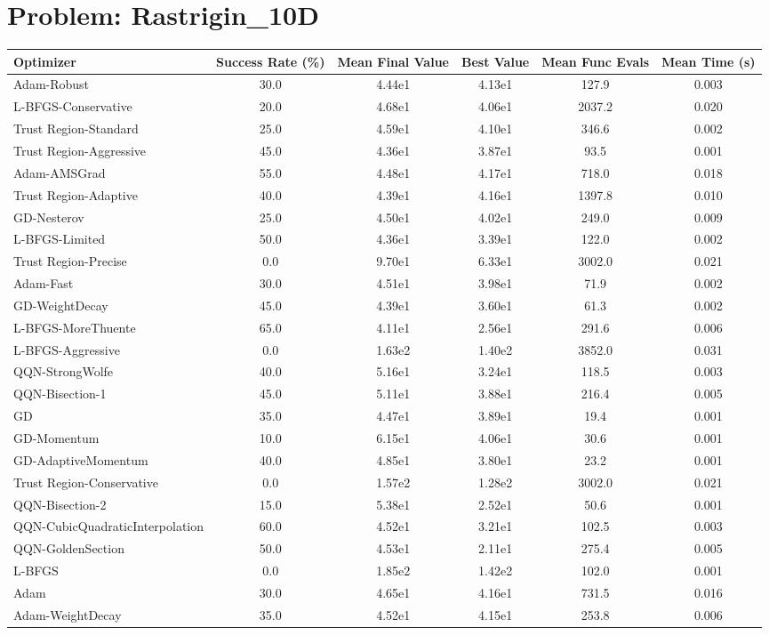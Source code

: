 \documentclass{article}
\begin{document}
\section{Problem: Rastrigin\_10D}
\begin{longtable}{p{3cm}*{5}{c}}
\toprule
\textbf{Optimizer} & \textbf{Success Rate (\%)} & \textbf{Mean Final Value} & \textbf{Best Value} & \textbf{Mean Func Evals} & \textbf{Mean Time (s)} \\
\midrule
Adam-Robust & 30.0 & 4.44e1 & 4.13e1 & 127.9 & 0.003 \\
L-BFGS-Conservative & 20.0 & 4.68e1 & 4.06e1 & 2037.2 & 0.020 \\
Trust Region-Standard & 25.0 & 4.59e1 & 4.10e1 & 346.6 & 0.002 \\
Trust Region-Aggressive & 45.0 & 4.36e1 & 3.87e1 & 93.5 & 0.001 \\
Adam-AMSGrad & 55.0 & 4.48e1 & 4.17e1 & 718.0 & 0.018 \\
Trust Region-Adaptive & 40.0 & 4.39e1 & 4.16e1 & 1397.8 & 0.010 \\
GD-Nesterov & 25.0 & 4.50e1 & 4.02e1 & 249.0 & 0.009 \\
L-BFGS-Limited & 50.0 & 4.36e1 & 3.39e1 & 122.0 & 0.002 \\
Trust Region-Precise & 0.0 & 9.70e1 & 6.33e1 & 3002.0 & 0.021 \\
Adam-Fast & 30.0 & 4.51e1 & 3.98e1 & 71.9 & 0.002 \\
GD-WeightDecay & 45.0 & 4.39e1 & 3.60e1 & 61.3 & 0.002 \\
L-BFGS-MoreThuente & 65.0 & 4.11e1 & 2.56e1 & 291.6 & 0.006 \\
L-BFGS-Aggressive & 0.0 & 1.63e2 & 1.40e2 & 3852.0 & 0.031 \\
QQN-StrongWolfe & 40.0 & 5.16e1 & 3.24e1 & 118.5 & 0.003 \\
QQN-Bisection-1 & 45.0 & 5.11e1 & 3.88e1 & 216.4 & 0.005 \\
GD & 35.0 & 4.47e1 & 3.89e1 & 19.4 & 0.001 \\
GD-Momentum & 10.0 & 6.15e1 & 4.06e1 & 30.6 & 0.001 \\
GD-AdaptiveMomentum & 40.0 & 4.85e1 & 3.80e1 & 23.2 & 0.001 \\
Trust Region-Conservative & 0.0 & 1.57e2 & 1.28e2 & 3002.0 & 0.021 \\
QQN-Bisection-2 & 15.0 & 5.38e1 & 2.52e1 & 50.6 & 0.001 \\
QQN-CubicQuadraticInterpolation & 60.0 & 4.52e1 & 3.21e1 & 102.5 & 0.003 \\
QQN-GoldenSection & 50.0 & 4.53e1 & 2.11e1 & 275.4 & 0.005 \\
L-BFGS & 0.0 & 1.85e2 & 1.42e2 & 102.0 & 0.001 \\
Adam & 30.0 & 4.65e1 & 4.16e1 & 731.5 & 0.016 \\
Adam-WeightDecay & 35.0 & 4.52e1 & 4.15e1 & 253.8 & 0.006 \\
\bottomrule
\end{longtable}
\end{document}
